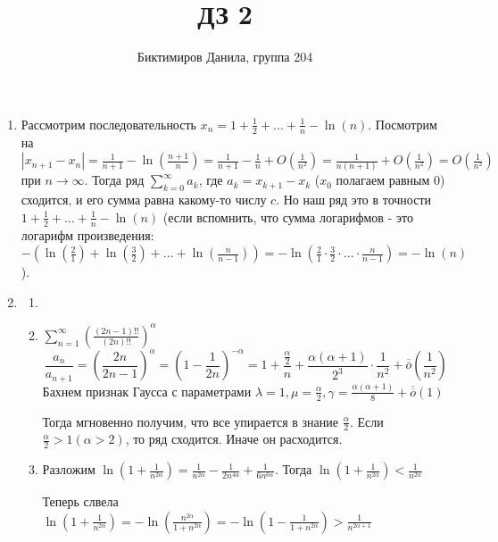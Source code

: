 \documentclass[11pt]{article}
\begin{document}
	
	\author{Биктимиров Данила, группа 204}
	\title{ДЗ 2}
	\date{}
	\maketitle
	
	\medskip
	
	\begin{enumerate}
		
		\item Рассмотрим последовательность $x_n = 1+\frac{1}{2}+...+\frac{1}{n} - \ln(n) $. Посмотрим на $\left\lvert x_{n+1} - x_n \right\rvert = \frac{1}{n+1} - \ln(\frac{n+1}{n}) = \frac{1}{n+1} - \frac{1}{n} + O(\frac{1}{n^2}) = \frac{1}{n(n+1)} + O(\frac{1}{n^2}) = O(\frac{1}{n^2})$ при $n \to \infty$.
		Тогда ряд $\sum\limits_{k=0}^{\infty}a_k$, где $a_k = x_{k+1} - x_k$ ($x_0$ полагаем равным 0) сходится, и его сумма равна какому-то числу $c$. Но наш ряд это в точности $ 1+\frac{1}{2}+...+\frac{1}{n} - \ln(n)$ (если вспомнить, что сумма логарифмов - это логарифм произведения: $-(\ln(\frac{2}{1})+\ln(\frac{3}{2})+...+\ln(\frac{n}{n-1})) = -\ln(\frac{2}{1} \cdot \frac{3}{2} \cdot ... \cdot \frac{n}{n-1}) = -\ln(n)$).
		
		\item \begin{enumerate}
			\item
			 
			\item $\sum_{n=1}^{\infty}\left(\frac{(2n-1)!!}{(2n)!!}\right)^\alpha$
			$$\frac{a_n}{a_{n+1}}=\left(\frac{2n}{2n-1}\right)^\alpha=\left(1-\frac{1}{2n}\right)^{-\alpha}=1+\frac{\frac{\alpha}{2}}{n}+\frac{\alpha(\alpha+1)}{2^3}\cdot \frac{1}{n^2}+\overline{\overline{o}}\left(\frac{1}{n^2}\right)$$
			Бахнем признак Гаусса с параметрами $\lambda=1, \mu=\frac{\alpha}{2},\gamma=\frac{\alpha(\alpha+1)}{8}+\overline{\overline{o}}(1)$
			
			Тогда мгновенно получим, что все упирается в знание $\frac{\alpha}{2}$. Если $\frac{\alpha}{2}>1 (\alpha>2)$, то ряд сходится. Иначе он расходится.
			\item Разложим $\ln \left(1+\frac{1}{n^{2\alpha}}\right)=\frac{1}{n^{2\alpha}}-\frac{1}{2n^{4\alpha}}+\frac{1}{6n^{6\alpha}}$. Тогда $\ln \left(1+\frac{1}{n^{2\alpha}}\right)<\frac{1}{n^{2\alpha}}$
			
			Теперь слвела $\ln\left(1+\frac{1}{n^{2\alpha}}\right)=-\ln\left(\frac{n^{2\alpha}}{1+n^{2\alpha}}\right)=-\ln\left(1-\frac{1}{1+n^{2\alpha}}\right)>\frac{1}{n^{2\alpha+1}}$
			

\end{enumerate}
\end{enumerate}
\end{document}
